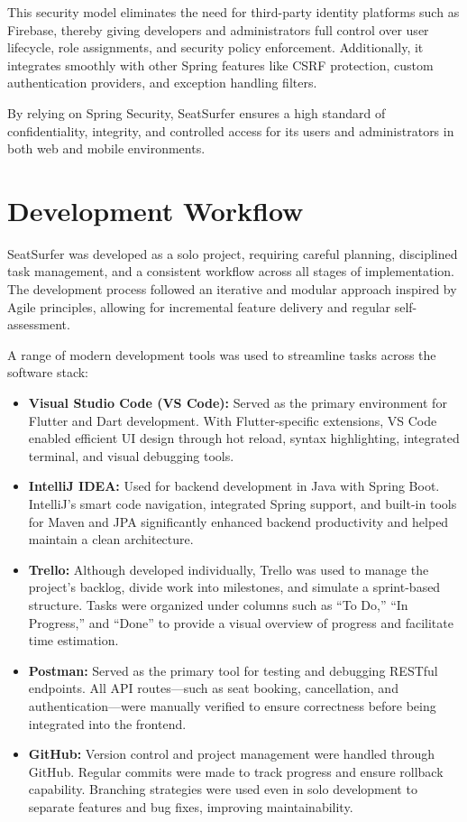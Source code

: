 \documentclass[12pt,a4paper]{report}
\begin{document}
\noindent
This security model eliminates the need for third-party identity platforms such as Firebase, thereby giving developers and administrators full control over user lifecycle, role assignments, and security policy enforcement. Additionally, it integrates smoothly with other Spring features like CSRF protection, custom authentication providers, and exception handling filters.

By relying on Spring Security, SeatSurfer ensures a high standard of confidentiality, integrity, and controlled access for its users and administrators in both web and mobile environments.

\section{Development Workflow}

SeatSurfer was developed as a solo project, requiring careful planning, disciplined task management, and a consistent workflow across all stages of implementation. The development process followed an iterative and modular approach inspired by Agile principles, allowing for incremental feature delivery and regular self-assessment.

A range of modern development tools was used to streamline tasks across the software stack:

\begin{itemize}
    \item \textbf{Visual Studio Code (VS Code):} Served as the primary environment for Flutter and Dart development. With Flutter-specific extensions, VS Code enabled efficient UI design through hot reload, syntax highlighting, integrated terminal, and visual debugging tools.

    \item \textbf{IntelliJ IDEA:} Used for backend development in Java with Spring Boot. IntelliJ's smart code navigation, integrated Spring support, and built-in tools for Maven and JPA significantly enhanced backend productivity and helped maintain a clean architecture.

    \item \textbf{Trello:} Although developed individually, Trello was used to manage the project's backlog, divide work into milestones, and simulate a sprint-based structure. Tasks were organized under columns such as “To Do,” “In Progress,” and “Done” to provide a visual overview of progress and facilitate time estimation.

    \item \textbf{Postman:} Served as the primary tool for testing and debugging RESTful endpoints. All API routes—such as seat booking, cancellation, and authentication—were manually verified to ensure correctness before being integrated into the frontend.

    \item \textbf{GitHub:} Version control and project management were handled through GitHub. Regular commits were made to track progress and ensure rollback capability. Branching strategies were used even in solo development to separate features and bug fixes, improving maintainability.
\end{itemize}
\end{document}
